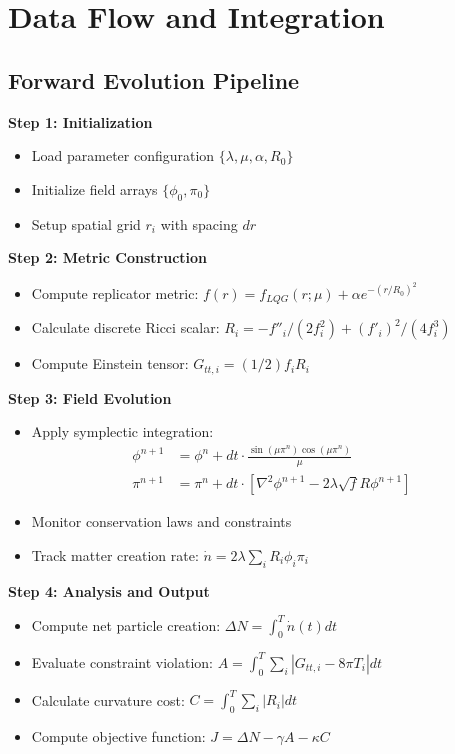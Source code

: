 \documentclass[11pt]{article}
\begin{document}
\section{Data Flow and Integration}

\subsection{Forward Evolution Pipeline}

\textbf{Step 1: Initialization}
\begin{itemize}
\item Load parameter configuration $\{\lambda, \mu, \alpha, R_0\}$
\item Initialize field arrays $\{\phi_0, \pi_0\}$
\item Setup spatial grid $r_i$ with spacing $dr$
\end{itemize}

\textbf{Step 2: Metric Construction}
\begin{itemize}
\item Compute replicator metric: $f(r) = f_{LQG}(r;\mu) + \alpha e^{-(r/R_0)^2}$
\item Calculate discrete Ricci scalar: $R_i = -f''_i/(2f_i^2) + (f'_i)^2/(4f_i^3)$
\item Compute Einstein tensor: $G_{tt,i} = (1/2)f_i R_i$
\end{itemize}

\textbf{Step 3: Field Evolution}
\begin{itemize}
\item Apply symplectic integration:
  \begin{align}
  \phi^{n+1} &= \phi^n + dt \cdot \frac{\sin(\mu\pi^n)\cos(\mu\pi^n)}{\mu} \\
  \pi^{n+1} &= \pi^n + dt \cdot [\nabla^2\phi^{n+1} - 2\lambda\sqrt{f}R\phi^{n+1}]
  \end{align}
\item Monitor conservation laws and constraints
\item Track matter creation rate: $\dot{n} = 2\lambda \sum_i R_i \phi_i \pi_i$
\end{itemize}

\textbf{Step 4: Analysis and Output}
\begin{itemize}
\item Compute net particle creation: $\Delta N = \int_0^T \dot{n}(t) dt$
\item Evaluate constraint violation: $A = \int_0^T \sum_i |G_{tt,i} - 8\pi T_i| dt$
\item Calculate curvature cost: $C = \int_0^T \sum_i |R_i| dt$
\item Compute objective function: $J = \Delta N - \gamma A - \kappa C$
\end{itemize}
\end{document}

